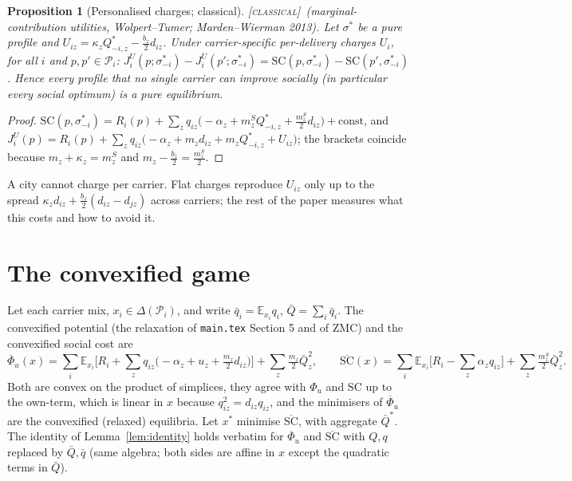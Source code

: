 \documentclass[11pt]{article}
\newtheorem{proposition}[theorem]{Proposition}
\theoremstyle{definition}
\theoremstyle{remark}
\newcommand{\cP}{\mathcal{P}}
\newcommand{\Qbar}{\bar Q}
\newcommand{\SC}{\mathrm{SC}}
\newcommand{\SCbar}{\overline{\mathrm{SC}}}
\newcommand{\Phibar}{\overline{\Phi}}
\newcommand{\CLASSICAL}{{\normalfont\textsc{[classical]}}}
\begin{document}
\begin{proposition}[Personalised charges; classical]\label{prop:pers}\CLASSICAL\ (marginal-contribution utilities, Wolpert--Tumer; Marden--Wierman 2013).
Let $\sigma^*$ be a pure profile and $U_{iz}=\kappa_zQ^*_{-i,z}-\tfrac{b_z}{2}d_{iz}$. Under carrier-specific per-delivery charges $U_i$, for all $i$ and $p,p'\in\cP_i$: $J^{U}_i(p;\sigma^*_{-i})-J^{U}_i(p';\sigma^*_{-i})=\SC(p,\sigma^*_{-i})-\SC(p',\sigma^*_{-i})$. Hence every profile that no single carrier can improve socially (in particular every social optimum) is a pure equilibrium.
\end{proposition}
\begin{proof}
$\SC(p,\sigma^*_{-i})=R_i(p)+\sum_zq_{iz}\big(-\alpha_z+m^S_zQ^*_{-i,z}+\tfrac{m^S_z}{2}d_{iz}\big)+\text{const}$, and $J^U_i(p)=R_i(p)+\sum_zq_{iz}\big(-\alpha_z+m_zd_{iz}+m_zQ^*_{-i,z}+U_{iz}\big)$; the brackets coincide because $m_z+\kappa_z=m^S_z$ and $m_z-\tfrac{b_z}{2}=\tfrac{m^S_z}{2}$.
\end{proof}

A city cannot charge per carrier. Flat charges reproduce $U_{iz}$ only up to the spread $\kappa_zd_{iz}+\tfrac{b_z}{2}(d_{iz}-d_{jz})$ across carriers; the rest of the paper measures what this costs and how to avoid it.

\section{The convexified game}

Let each carrier mix, $x_i\in\Delta(\cP_i)$, and write $\bar q_i=\mathbb E_{x_i}q_i$, $\Qbar=\sum_i\bar q_i$. The convexified potential (the relaxation of \texttt{main.tex} Section 5 and of ZMC) and the convexified social cost are
\[\Phibar_u(x)=\sum_i\mathbb E_{x_i}\Big[R_i+\sum_zq_{iz}\big(-\alpha_z+u_z+\tfrac{m_z}{2}d_{iz}\big)\Big]+\sum_z\tfrac{m_z}{2}\Qbar_z^2,\qquad
\SCbar(x)=\sum_i\mathbb E_{x_i}\Big[R_i-\sum_z\alpha_zq_{iz}\Big]+\sum_z\tfrac{m^S_z}{2}\Qbar_z^2.\]
Both are convex on the product of simplices, they agree with $\Phi_u$ and $\SC$ up to the own-term, which is linear in $x$ because $q_{iz}^2=d_{iz}q_{iz}$, and the minimisers of $\Phibar_u$ are the convexified (relaxed) equilibria. Let $x^*$ minimise $\SCbar$, with aggregate $\Qbar^*$. The identity of Lemma~\ref{lem:identity} holds verbatim for $\Phibar_u$ and $\SCbar$ with $Q,q$ replaced by $\Qbar,\bar q$ (same algebra; both sides are affine in $x$ except the quadratic terms in $\Qbar$).
\end{document}
